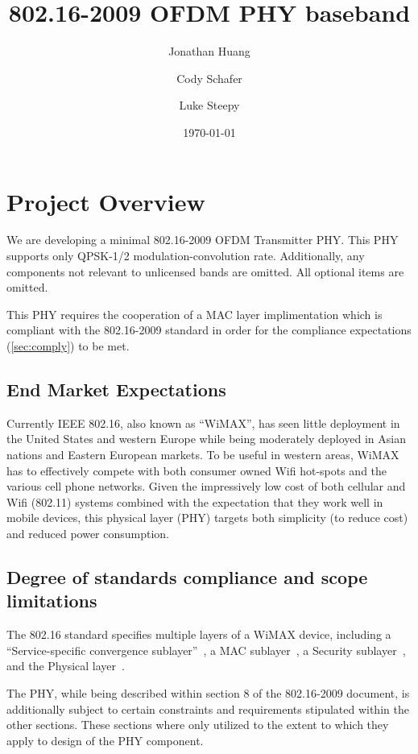 \documentclass[dvips,10pt,twocolumn]{article}
\title{802.16-2009 OFDM PHY baseband}
\author{Jonathan Huang \and Cody Schafer \and Luke Steepy}
\date{\today}
\begin{document}
\maketitle
\section{Project Overview}
We are developing a minimal 802.16-2009 OFDM Transmitter PHY.  This PHY
supports only QPSK-1/2 modulation-convolution rate. Additionally, any
components not relevant to unlicensed bands are omitted.  All optional items
are omitted.

This PHY requires the cooperation of a MAC layer implimentation which is
compliant with the 802.16-2009 standard in order for the compliance
expectations (\autoref{sec:comply}) to be met.

	\subsection{End Market Expectations}
	Currently IEEE 802.16, also known as ``WiMAX'', has seen little
	deployment in the United States and western Europe while being
	moderately deployed in Asian nations and Eastern European markets.
	To be useful in western areas, WiMAX has to effectively compete
	with both consumer owned Wifi hot-spots and the various cell phone
	networks. Given the impressively low cost of both cellular and Wifi
	(802.11) systems combined with the expectation that they work well
	in mobile devices, this physical layer (PHY) targets both
	simplicity (to reduce cost) and reduced power consumption.

	\subsection{Degree of standards compliance and scope limitations}
	\label{sec:comply}
	The 802.16 standard specifies multiple layers of a WiMAX device,
	including a ``Service-specific convergence
	sublayer''~\cite[section 5]{IEEE:802.16}, a MAC
	sublayer~\cite[section 6]{IEEE:802.16}, a Security
	sublayer~\cite[section 7]{IEEE:802.16}, and the Physical
	layer~\cite[section 8]{IEEE:802.16}. 
	
	The PHY, while being described within section 8 of the 802.16-2009
	document, is additionally subject to certain constraints and
	requirements stipulated within the other sections.  These sections
	where only utilized to the extent to which they apply to design of
	the PHY component.
\end{document}
